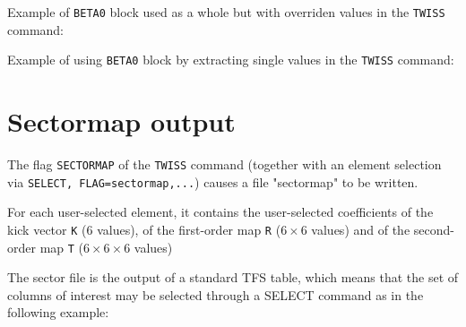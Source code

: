 Example of {\tt BETA0} block used as a whole but with overriden
values in the {\tt TWISS} command:

Example of using {\tt BETA0} block by extracting single values in the
{\tt TWISS} command:


%
\section{Sectormap output}
\label{sec:sectormap}

The flag {\tt SECTORMAP} of the {\tt TWISS} command (together with an element
selection via {\tt SELECT, FLAG=sectormap,...}) causes a file "sectormap" to be
written.

For each user-selected element, it contains the user-selected coefficients of 
the kick vector {\tt K} ($6$ values), of the first-order map {\tt R} 
($6\times6$ values) and of the second-order map {\tt T} ($6\times6\times6$ 
values)

The sector file is the output of a standard TFS table, which means that
the set of columns of interest may be selected through a SELECT command
as in the following example:  


